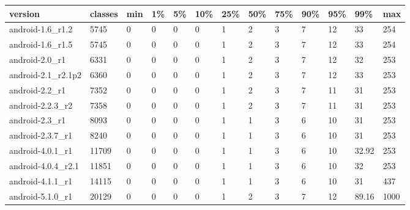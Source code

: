 \begin{tabular}{|l|l|l|l|l|l|l|l|l|l|l|l|l|}
\hline
version&classes&min&1\%&5\%&10\%&25\%&50\%&75\%&90\%&95\%&99\%&max\\
\hline
android-1.6\_r1.2&5745&0&0&0&0&1&2&3&7&12&33&254\\
\hline
android-1.6\_r1.5&5745&0&0&0&0&1&2&3&7&12&33&254\\
\hline
android-2.0\_r1&6331&0&0&0&0&1&2&3&7&12&32&253\\
\hline
android-2.1\_r2.1p2&6360&0&0&0&0&1&2&3&7&12&33&253\\
\hline
android-2.2\_r1&7352&0&0&0&0&1&2&3&7&11&31&253\\
\hline
android-2.2.3\_r2&7358&0&0&0&0&1&2&3&7&11&31&253\\
\hline
android-2.3\_r1&8093&0&0&0&0&1&1&3&6&10&31&253\\
\hline
android-2.3.7\_r1&8240&0&0&0&0&1&1&3&6&10&31&253\\
\hline
android-4.0.1\_r1&11709&0&0&0&0&1&1&3&6&10&32.92&253\\
\hline
android-4.0.4\_r2.1&11851&0&0&0&0&1&1&3&6&10&32&253\\
\hline
android-4.1.1\_r1&14115&0&0&0&0&1&1&3&6&10&31&437\\
\hline
android-5.1.0\_r1&20129&0&0&0&0&1&2&3&7&12&89.16&1000\\
\hline
\end{tabular}
